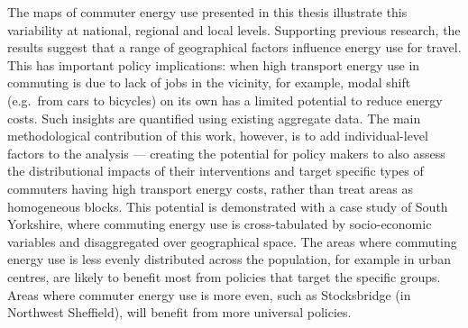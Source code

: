 \documentclass[a4paper, 11pt, twoside]{Thesis}  %
\begin{document}
{%
The maps of commuter energy use presented in this thesis
illustrate this variability at national, regional and local levels.
Supporting previous research, the results suggest that a
range of geographical factors influence energy use for travel.
This
has important policy implications: when high transport energy use in commuting
is due to lack of jobs in
the vicinity, for example, modal shift (e.g.~from cars to bicycles)
on its own has a limited potential to reduce
energy costs. Such insights are quantified using existing aggregate data.
The main methodological contribution of this work, however, is to add
individual-level factors to
the analysis --- creating the potential for policy makers to also assess the
distributional
impacts of their interventions and target specific types of
commuters having high transport energy costs,
rather than treat areas as homogeneous blocks. This potential is
demonstrated with a case study of South
Yorkshire, where commuting energy use is cross-tabulated by
socio-economic variables and disaggregated over geographical space.
The areas where commuting energy use is less evenly distributed across the population, 
for example in urban centres, are
likely to benefit most from policies that target the specific groups.
Areas where commuter
energy use is more even, such as
Stocksbridge (in Northwest Sheffield), will benefit from more universal policies.


}
\end{document}
